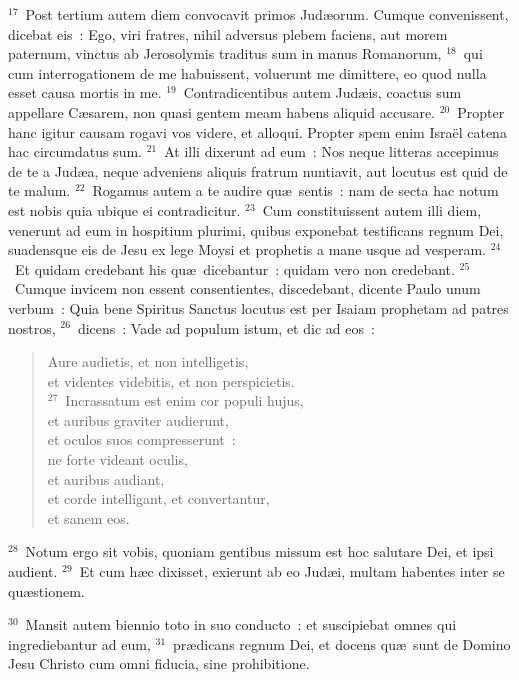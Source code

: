 ${}^{17}$~Post tertium autem diem convocavit primos Jud\ae orum. Cumque convenissent, dicebat eis~: Ego, viri fratres, nihil adversus plebem faciens, aut morem paternum, vinctus ab Jerosolymis traditus sum in manus Romanorum,
${}^{18}$~qui cum interrogationem de me habuissent, voluerunt me dimittere, eo quod nulla esset causa mortis in me.
${}^{19}$~Contradicentibus autem Jud\ae is, coactus sum appellare C\ae sarem, non quasi gentem meam habens aliquid accusare.
${}^{20}$~Propter hanc igitur causam rogavi vos videre, et alloqui. Propter spem enim Isra\"el catena hac circumdatus sum.
${}^{21}$~At illi dixerunt ad eum~: Nos neque litteras accepimus de te a Jud\ae a, neque adveniens aliquis fratrum nuntiavit, aut locutus est quid de te malum.
${}^{22}$~Rogamus autem a te audire qu\ae\ sentis~: nam de secta hac notum est nobis quia ubique ei contradicitur.
${}^{23}$~Cum constituissent autem illi diem, venerunt ad eum in hospitium plurimi, quibus exponebat testificans regnum Dei, suadensque eis de Jesu ex lege Moysi et prophetis a mane usque ad vesperam.
${}^{24}$~Et quidam credebant his qu\ae\ dicebantur~: quidam vero non credebant.
${}^{25}$~Cumque invicem non essent consentientes, discedebant, dicente Paulo unum verbum~: Quia bene Spiritus Sanctus locutus est per Isaiam prophetam ad patres nostros,
${}^{26}$~dicens~: Vade ad populum istum, et dic ad eos~: \begin{flushleft}\begin{verse}Aure audietis, et non intelligetis,\\ et videntes videbitis, et non perspicietis.\\
${}^{27}$~Incrassatum est enim cor populi hujus,\\ et auribus graviter audierunt,\\ et oculos suos compresserunt~:\\ ne forte videant oculis,\\ et auribus audiant,\\ et corde intelligant, et convertantur,\\ et sanem eos.\end{verse}\end{flushleft}


${}^{28}$~Notum ergo sit vobis, quoniam gentibus missum est hoc salutare Dei, et ipsi audient.
${}^{29}$~Et cum h\ae c dixisset, exierunt ab eo Jud\ae i, multam habentes inter se qu\ae stionem.


${}^{30}$~Mansit autem biennio toto in suo conducto~: et suscipiebat omnes qui ingrediebantur ad eum,
${}^{31}$~pr\ae dicans regnum Dei, et docens qu\ae\ sunt de Domino Jesu Christo cum omni fiducia, sine prohibitione.
